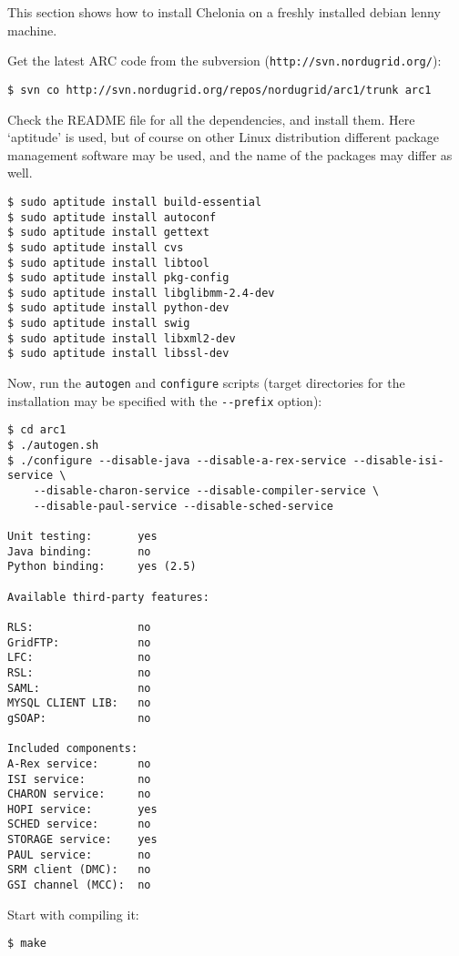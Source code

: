 \documentclass{article}
\begin{document}
This section shows how to install Chelonia on a freshly installed debian lenny machine.

Get the latest ARC code from the subversion (\verb!http://svn.nordugrid.org/!):

\begin{verbatim}
$ svn co http://svn.nordugrid.org/repos/nordugrid/arc1/trunk arc1
\end{verbatim}

Check the README file for all the dependencies, and install them. Here `aptitude' is used, but of course on other Linux distribution different package management software may be used, and the name of the packages may differ as well.

\begin{verbatim}
$ sudo aptitude install build-essential
$ sudo aptitude install autoconf
$ sudo aptitude install gettext
$ sudo aptitude install cvs
$ sudo aptitude install libtool
$ sudo aptitude install pkg-config
$ sudo aptitude install libglibmm-2.4-dev
$ sudo aptitude install python-dev
$ sudo aptitude install swig
$ sudo aptitude install libxml2-dev
$ sudo aptitude install libssl-dev
\end{verbatim}

Now, run the \verb!autogen! and \verb!configure! scripts (target directories for the installation may be specified with the \verb!--prefix! option):

\begin{verbatim}
$ cd arc1
$ ./autogen.sh
$ ./configure --disable-java --disable-a-rex-service --disable-isi-service \
    --disable-charon-service --disable-compiler-service \
    --disable-paul-service --disable-sched-service

Unit testing:       yes
Java binding:       no
Python binding:     yes (2.5)

Available third-party features:

RLS:                no
GridFTP:            no
LFC:                no
RSL:                no
SAML:               no
MYSQL CLIENT LIB:   no
gSOAP:              no

Included components:
A-Rex service:      no
ISI service:        no
CHARON service:     no
HOPI service:       yes
SCHED service:      no
STORAGE service:    yes
PAUL service:       no
SRM client (DMC):   no
GSI channel (MCC):  no

\end{verbatim}

Start with compiling it:

\begin{verbatim}
$ make
\end{verbatim}
\end{document}
